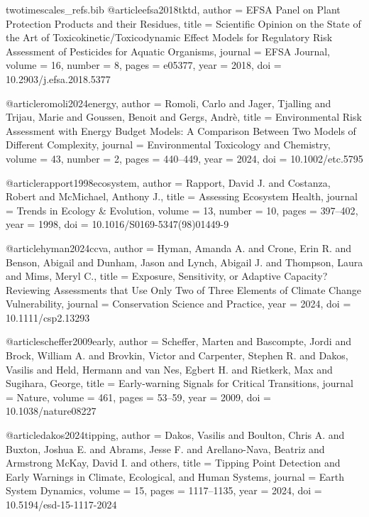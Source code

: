 \begin{filecontents*}{twotimescales_refs.bib}
@article{efsa2018tktd,
  author  = {{EFSA Panel on Plant Protection Products and their Residues}},
  title   = {Scientific Opinion on the State of the Art of Toxicokinetic/Toxicodynamic Effect Models for Regulatory Risk Assessment of Pesticides for Aquatic Organisms},
  journal = {EFSA Journal},
  volume  = {16},
  number  = {8},
  pages   = {e05377},
  year    = {2018},
  doi     = {10.2903/j.efsa.2018.5377}
}

@article{romoli2024energy,
  author  = {Romoli, Carlo and Jager, Tjalling and Trijau, Marie and Goussen, Benoit and Gergs, Andr{\`e}},
  title   = {Environmental Risk Assessment with Energy Budget Models: A Comparison Between Two Models of Different Complexity},
  journal = {Environmental Toxicology and Chemistry},
  volume  = {43},
  number  = {2},
  pages   = {440--449},
  year    = {2024},
  doi     = {10.1002/etc.5795}
}

@article{rapport1998ecosystem,
  author  = {Rapport, David J. and Costanza, Robert and McMichael, Anthony J.},
  title   = {Assessing Ecosystem Health},
  journal = {Trends in Ecology \& Evolution},
  volume  = {13},
  number  = {10},
  pages   = {397--402},
  year    = {1998},
  doi     = {10.1016/S0169-5347(98)01449-9}
}

@article{hyman2024ccva,
  author  = {Hyman, Amanda A. and Crone, Erin R. and Benson, Abigail and Dunham, Jason and Lynch, Abigail J. and Thompson, Laura and Mims, Meryl C.},
  title   = {Exposure, Sensitivity, or Adaptive Capacity? Reviewing Assessments that Use Only Two of Three Elements of Climate Change Vulnerability},
  journal = {Conservation Science and Practice},
  year    = {2024},
  doi     = {10.1111/csp2.13293}
}

@article{scheffer2009early,
  author  = {Scheffer, Marten and Bascompte, Jordi and Brock, William A. and Brovkin, Victor and Carpenter, Stephen R. and Dakos, Vasilis and Held, Hermann and van Nes, Egbert H. and Rietkerk, Max and Sugihara, George},
  title   = {Early-warning Signals for Critical Transitions},
  journal = {Nature},
  volume  = {461},
  pages   = {53--59},
  year    = {2009},
  doi     = {10.1038/nature08227}
}

@article{dakos2024tipping,
  author  = {Dakos, Vasilis and Boulton, Chris A. and Buxton, Joshua E. and Abrams, Jesse F. and Arellano-Nava, Beatriz and Armstrong McKay, David I. and others},
  title   = {Tipping Point Detection and Early Warnings in Climate, Ecological, and Human Systems},
  journal = {Earth System Dynamics},
  volume  = {15},
  pages   = {1117--1135},
  year    = {2024},
  doi     = {10.5194/esd-15-1117-2024}
}


\end{filecontents*}
